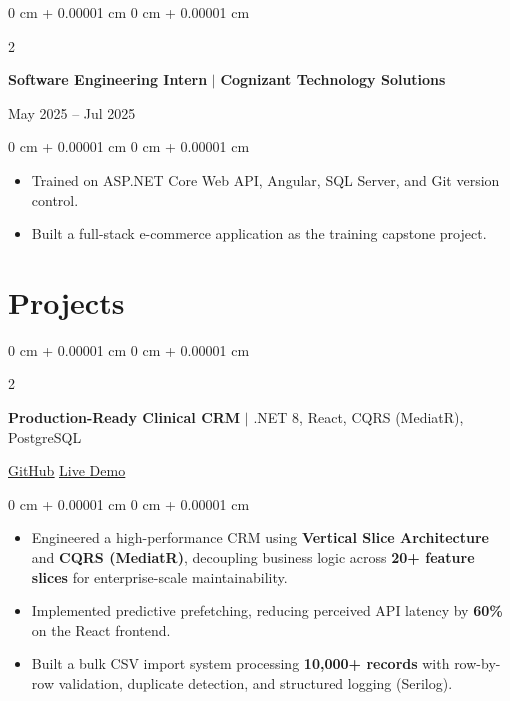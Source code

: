 \documentclass[10pt, letterpaper]{article}
\newenvironment{highlights}{
    \begin{itemize}[
        topsep=0.10 cm,
        parsep=0.10 cm,
        partopsep=0pt,
        itemsep=0pt,
        leftmargin=0 cm + 10pt
    ]
}{
    \end{itemize}
} %
\newenvironment{onecolentry}{
    \begin{adjustwidth}{
        0 cm + 0.00001 cm
    }{
        0 cm + 0.00001 cm
    }
}{
    \end{adjustwidth}
} %
\newenvironment{twocolentry}[2][]{
    \onecolentry
    \def\secondColumn{#2}
    \setcolumnwidth{\fill, 4.5 cm}
    \begin{paracol}{2}
}{
    \switchcolumn \raggedleft \secondColumn
    \end{paracol}
    \endonecolentry
} %
\let\hrefWithoutArrow\href
\begin{document}
        \vspace{0.2 cm}

        \begin{twocolentry}{
            May 2025 -- Jul 2025
        }
            \textbf{Software Engineering Intern} $|$ \textbf{Cognizant Technology Solutions}
        \end{twocolentry}
        \vspace{0.10 cm}
        \begin{onecolentry}
            \begin{highlights}
                \item Trained on ASP.NET Core Web API, Angular, SQL Server, and Git version control.
                \item Built a full-stack e-commerce application as the training capstone project.
            \end{highlights}
        \end{onecolentry}

    \section{Projects}

        \begin{twocolentry}{
            \hrefWithoutArrow{\CrmGithubProject}{\underline{GitHub}}
            \textbar{}
            \hrefWithoutArrow{\CrmUrl}{\underline{Live Demo}}
        }
            \textbf{Production-Ready Clinical CRM} $|$ .NET 8, React, CQRS (MediatR), PostgreSQL
        \end{twocolentry}

        \vspace{0.10 cm}
        \begin{onecolentry}
            \begin{highlights}
                \item Engineered a high-performance CRM using \textbf{Vertical Slice Architecture} and \textbf{CQRS (MediatR)}, decoupling business logic across \textbf{20+ feature slices} for enterprise-scale maintainability.
                \item Implemented predictive prefetching, reducing perceived API latency by \textbf{60\%} on the React frontend.
                \item Built a bulk CSV import system processing \textbf{10,000+ records} with row-by-row validation, duplicate detection, and structured logging (Serilog).
            \end{highlights}
        \end{onecolentry}
\end{document}
